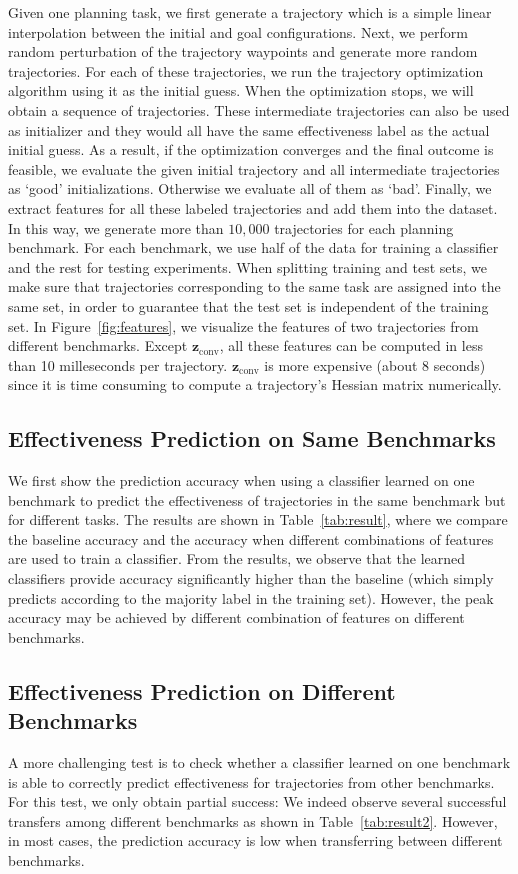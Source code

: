 \documentclass[letterpaper, 10 pt, conference]{ieeeconf}  %
\newcommand{\fconv}{\mbox{$\mathbf z_{\text{conv}}$}}
\begin{document}
Given one planning task, we first generate a trajectory which is a simple linear interpolation between the initial and goal configurations. Next, we perform random perturbation of the trajectory waypoints and generate more random trajectories. For each of these trajectories, we run the trajectory optimization algorithm using it as the initial guess. When the optimization stops, we will obtain a sequence of trajectories. These intermediate trajectories can also be used as initializer and they would all have the same effectiveness label as the actual initial guess. As a result, if the optimization converges and the final outcome is feasible, we evaluate the given initial trajectory and all intermediate trajectories as `good' initializations. Otherwise we evaluate all of them as `bad'. Finally, we extract features for all these labeled trajectories and add them into the dataset. In this way, we generate more than $10,000$ trajectories for each planning benchmark. For each benchmark, we use half of the data for training a classifier and the rest for testing experiments. When splitting training and test sets, we make sure that trajectories corresponding to the same task are assigned into the same set, in order to guarantee that the test set is independent of the training set. In Figure~\ref{fig:features}, we visualize the features of two trajectories from different benchmarks. Except $\fconv$, all these features can be computed in less than 10 milleseconds per trajectory. $\fconv$ is more expensive (about 8 seconds) since it is time consuming to compute a trajectory's Hessian matrix numerically.

\subsection{Effectiveness Prediction on Same Benchmarks}
We first show the prediction accuracy when using a classifier learned on one benchmark to predict the effectiveness of trajectories in the same benchmark but for different tasks. The results are shown in Table~\ref{tab:result}, where we compare the baseline accuracy and the accuracy when different combinations of features are used to train a classifier. From the results, we observe that the learned classifiers provide accuracy significantly higher than the baseline (which simply predicts according to the majority label in the training set). However, the peak accuracy may be achieved by different combination of features on different benchmarks.

\subsection{Effectiveness Prediction on Different Benchmarks}
A more challenging test is to check whether a classifier learned on one benchmark is able to correctly predict effectiveness for trajectories from other benchmarks. For this test, we only obtain partial success: We indeed observe several successful transfers among different benchmarks as shown in Table~\ref{tab:result2}. However, in most cases, the prediction accuracy is low when transferring between different benchmarks.
\end{document}
